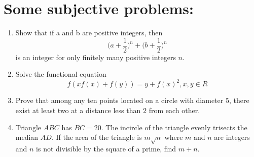 \documentclass{article} [12 pt]
\begin{document}
\section*{Some subjective problems:}
\begin{enumerate}
    \item Show that if a and b are positive integers, then
    $$\bigg(a+\frac{1}{2}\bigg)^n + \bigg(b+\frac{1}{2}\bigg)^n$$
is an integer for only finitely many positive integers $n$.
\item Solve the functional equation
$$f(xf(x)+f(y))=y+f(x)^2, x,y \in R$$
\item Prove that among any ten points located on a circle with diameter $5$, there exist at least two at a distance less than $2$ from each other.
\item Triangle $ABC$ has $BC=20.$ The incircle of the triangle evenly trisects the median $AD.$ If the area of the triangle is $m \sqrt{n}$ where $m$ and $n$ are integers and $n$ is not divisible by the square of a prime, find $m+n.$
\end{enumerate}
\end{document}
